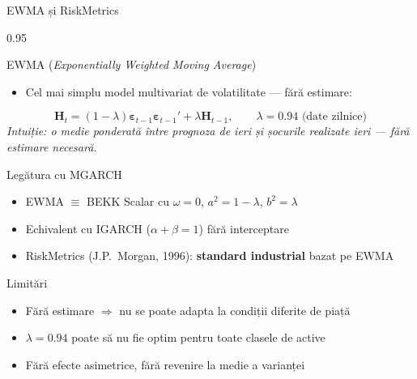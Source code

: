 \documentclass[9pt, aspectratio=169, t]{beamer}
\begin{document}
\begin{frame}{EWMA și RiskMetrics}
    \begin{cminipage}{0.95\textwidth}
    {\footnotesize
    \begin{block}{EWMA (\textit{Exponentially Weighted Moving Average})}
        \begin{itemize}\setlength{\itemsep}{0pt}
            \item Cel mai simplu model multivariat de volatilitate --- fără estimare:
        \end{itemize}
        \[
            \mathbf{H}_t = (1-\lambda)\boldsymbol{\varepsilon}_{t-1}\boldsymbol{\varepsilon}_{t-1}' + \lambda\mathbf{H}_{t-1}, \qquad \lambda = 0.94 \text{ (date zilnice)}
        \]
        \textit{Intuiție: o medie ponderată între prognoza de ieri și șocurile realizate ieri --- fără estimare necesară.}
    \end{block}
    \begin{block}{Legătura cu MGARCH}
        \begin{itemize}\setlength{\itemsep}{0pt}
            \item EWMA $\equiv$ BEKK Scalar cu $\omega = 0$, $a^2 = 1-\lambda$, $b^2 = \lambda$
            \item Echivalent cu IGARCH ($\alpha + \beta = 1$) fără interceptare
            \item RiskMetrics (J.P.\ Morgan, 1996): \textbf{standard industrial} bazat pe EWMA
        \end{itemize}
    \end{block}
    \begin{alertblock}{Limitări}
        \begin{itemize}\setlength{\itemsep}{0pt}
            \item Fără estimare $\Rightarrow$ nu se poate adapta la condiții diferite de piață
            \item $\lambda = 0.94$ poate să nu fie optim pentru toate clasele de active
            \item Fără efecte asimetrice, fără revenire la medie a varianței
        \end{itemize}
    \end{alertblock}
    }
    \end{cminipage}
\end{frame}
\end{document}
